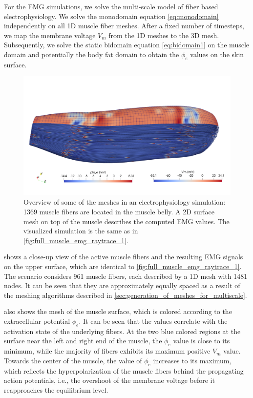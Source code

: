 For the EMG simulations, we solve the multi-scale model of fiber based electrophysiology. We solve the monodomain equation \cref{eq:monodomain} independently on all 1D muscle fiber meshes. 
After a fixed number of timesteps, we map the membrane voltage $V_m$ from the 1D meshes to the 3D mesh. Subsequently, we solve the static bidomain equation \cref{eq:bidomain1} on the muscle domain and potentially the body fat domain to obtain the $\phi_e$ values on the skin surface.

\begin{figure}
  \centering%
  \includegraphics[width=\textwidth]{images/results/application/fibers_4.png}
  \caption{Overview of some of the meshes in an electrophysiology simulation: 1369 muscle fibers are located in the muscle belly. A 2D surface mesh on top of the muscle describes the computed EMG values. The visualized simulation is the same as in \cref{fig:full_muscle_emg_raytrace_1}.}%
  \label{fig:fibers_4}%
\end{figure}

 shows a close-up view of the active muscle fibers and the resulting EMG signals on the upper surface, which are identical to \cref{fig:full_muscle_emg_raytrace_1}. The scenario considers 961 muscle fibers, each described by a 1D mesh with 1481 nodes. It can be seen that they are approximately equally spaced as a result of the meshing algorithms described in \cref{sec:generation_of_meshes_for_multiscale}.

 also shows the mesh of the muscle surface, which is colored according to the extracellular potential $\phi_e$. It can be seen that the values correlate with the activation state of the underlying fibers. At the two blue colored regions at the surface near the left and right end of the muscle, the $\phi_e$ value is close to its minimum, while the majority of fibers exhibits its maximum positive $V_m$ value. Towards the center of the muscle, the value of $\phi_e$ increases to its maximum, which reflects the hyperpolarization of the muscle fibers behind the propagating action potentials, i.e., the overshoot of the membrane voltage before it reapproaches the equilibrium level.

